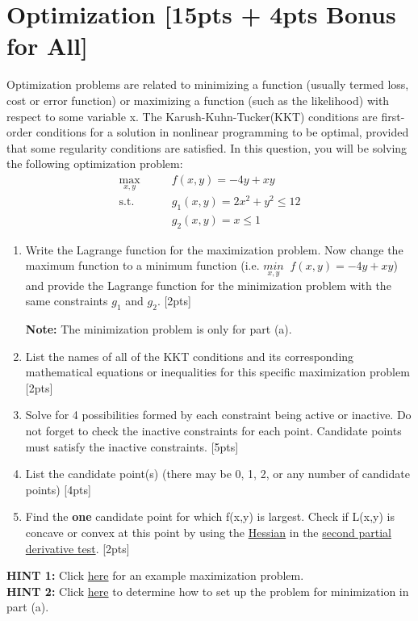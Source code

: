 \documentclass{article}
\begin{document}
\newpage
\section{Optimization [15pts + 4pts Bonus for All]}
Optimization problems are related to minimizing a function (usually termed loss, cost or error function) or maximizing a function (such as the likelihood) with respect to some variable x. The Karush-Kuhn-Tucker(KKT) conditions are first-order conditions for a solution in nonlinear programming to be optimal, provided that some regularity conditions are satisfied. In this question, you will be solving the following optimization problem:
\begin{align*}
    \max_{x,y} \qquad & f(x,y) = -4y + xy \\
    \text{s.t.} \qquad & g_{1}(x,y) = 2x^{2}+y^{2}\leq 12 \\
    & g_{2}(x,y) = x \leq 1
\end{align*}

\begin{enumerate}[label=(\alph*)]
    \item Write the Lagrange function for the maximization problem. Now change the maximum function to a minimum function (i.e. $\underset{x,y}{min} \;\; f(x,y) = -4y + xy$) and provide the Lagrange function for the minimization problem with the same constraints $g_1$ and $g_2$.  [2pts]
        \par\textbf{Note:} The minimization problem is only for part (a).
        
    \item List the names of all of the KKT conditions and its corresponding mathematical equations or inequalities for this specific maximization problem [2pts]
    
    \item Solve for 4 possibilities formed by each constraint being active or inactive. Do not forget to check the inactive constraints for each point. Candidate points must satisfy the inactive constraints.   [5pts]
    
    \item List the candidate point(s) (there may be 0, 1, 2, or any number of candidate points)  [4pts]
    
    \item Find the \textbf{one} candidate point for which f(x,y) is largest. Check if L(x,y) is concave or convex at this point by using the \href{https://www.khanacademy.org/math/multivariable-calculus/applications-of-multivariable-derivatives/quadratic-approximations/a/the-hessian}{Hessian} in the \href{https://www.khanacademy.org/math/multivariable-calculus/applications-of-multivariable-derivatives/optimizing-multivariable-functions/a/second-partial-derivative-test}{second partial derivative test}.  [2pts]
\end{enumerate}
\textbf{HINT 1:} Click \href{https://www.youtube.com/watch?v=TqN-8fxYUYY}{here} for an example maximization problem. \\
\textbf{HINT 2:} Click \href{https://en.wikipedia.org/wiki/Karush-Kuhn-Tucker_conditions#Nonlinear_optimization_problem}{here} to determine how to set up the problem for minimization in part (a).\\
\end{document}
